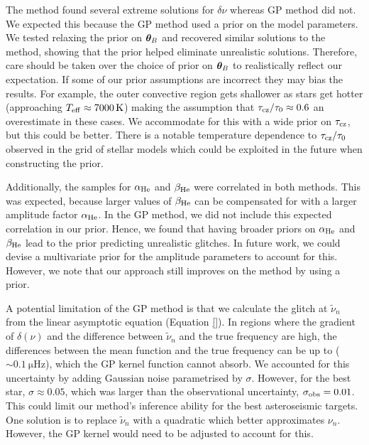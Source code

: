 
The  method found several extreme solutions for \(\delta\nu\) whereas GP method did not. We expected this because the GP method used a prior on the model parameters. We tested relaxing the prior on \(\bm{\theta}_B\) and recovered similar solutions to the  method, showing that the prior helped eliminate unrealistic solutions. Therefore, care should be taken over the choice of prior on \(\bm{\theta}_B\) to realistically reflect our expectation. If some of our prior assumptions are incorrect they may bias the results. For example, the outer convective region gets shallower as stars get hotter (approaching \(T_\mathrm{eff} \approx \SI{7000}{\kelvin}\)) making the assumption that \(\tau_{{\mathrm{cz}}}/\tau_0 \approx 0.6\) an overestimate in these cases. We accommodate for this with a wide prior on \(\tau_{{\mathrm{cz}}}\), but this could be better. There is a notable temperature dependence to \(\tau_{{\mathrm{cz}}}/\tau_0\) observed in the grid of stellar models which could be exploited in the future when constructing the prior.

Additionally, the samples for \(\alpha_{{\mathrm{He}}}\) and \(\beta_{{\mathrm{He}}}\) were correlated in both methods. This was expected, because larger values of \(\beta_{{\mathrm{He}}}\) can be compensated for with a larger amplitude factor \(\alpha_{{\mathrm{He}}}\). In the GP method, we did not include this expected correlation in our prior. Hence, we found that having broader priors on \(\alpha_{{\mathrm{He}}}\) and \(\beta_{{\mathrm{He}}}\) lead to the prior predicting unrealistic glitches. In future work, we could devise a multivariate prior for the amplitude parameters to account for this. However, we note that our approach still improves on the  method by using a prior.

A potential limitation of the GP method is that we calculate the glitch at \(\tilde{\nu}_n\) from the linear asymptotic equation (Equation \ref{}). In regions where the gradient of \(\delta(\nu)\) and the difference between \(\tilde{\nu}_n\) and the true frequency are high, the differences between the mean function and the true frequency can be up to (\(\sim \SI{0.1}{\micro\hertz}\)), which the GP kernel function cannot absorb. We accounted for this uncertainty by adding Gaussian noise parametrised by \(\sigma\). However, for the best star, \(\sigma \approx 0.05\), which was larger than the observational uncertainty, \(\sigma_{{\mathrm{obs}}} = 0.01\). This could limit our method's inference ability for the best asteroseismic targets. One solution is to replace \(\tilde{\nu}_n\) with a quadratic \citep[e.g.][]{Nielsen.Davies.ea2021} which better approximates \(\nu_n\). However, the GP kernel would need to be adjusted to account for this.

